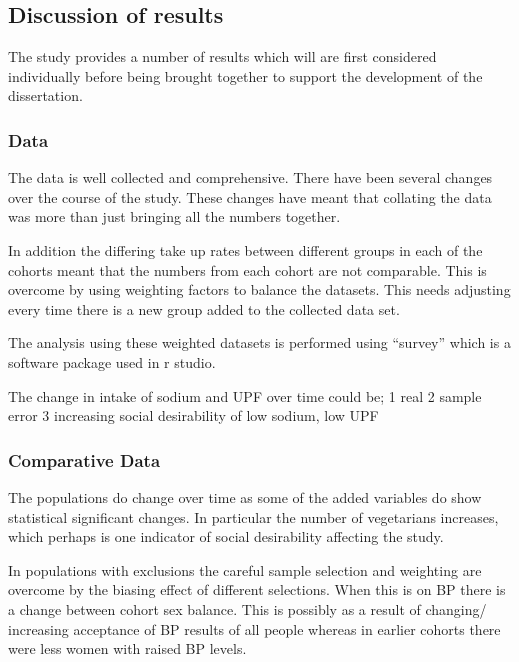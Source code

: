 \documentclass[
]{article}
\begin{document}
\hypertarget{discussion-of-results}{%
\subsection{Discussion of results}\label{discussion-of-results}}

The study provides a number of results which will are first considered
individually before being brought together to support the development of
the dissertation.

\hypertarget{data}{%
\subsubsection{Data}\label{data}}

The data is well collected and comprehensive. There have been several
changes over the course of the study. These changes have meant that
collating the data was more than just bringing all the numbers together.

In addition the differing take up rates between different groups in each
of the cohorts meant that the numbers from each cohort are not
comparable. This is overcome by using weighting factors to balance the
datasets. This needs adjusting every time there is a new group added to
the collected data set.

The analysis using these weighted datasets is performed using ``survey''
which is a software package used in r studio.

The change in intake of sodium and UPF over time could be; 1 real 2
sample error 3 increasing social desirability of low sodium, low UPF

\hypertarget{comparative-data}{%
\subsubsection{Comparative Data}\label{comparative-data}}

The populations do change over time as some of the added variables do
show statistical significant changes. In particular the number of
vegetarians increases, which perhaps is one indicator of social
desirability affecting the study.

In populations with exclusions the careful sample selection and
weighting are overcome by the biasing effect of different selections.
When this is on BP there is a change between cohort sex balance. This is
possibly as a result of changing/ increasing acceptance of BP results of
all people whereas in earlier cohorts there were less women with raised
BP levels.
\end{document}
